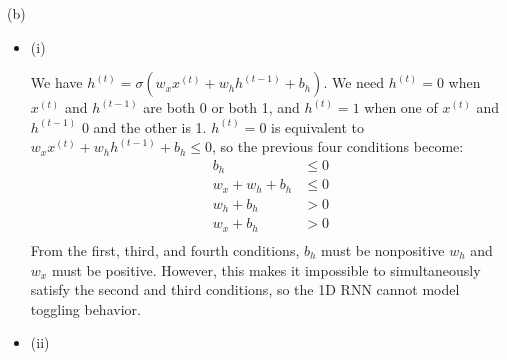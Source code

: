 \documentclass{article}
\begin{document}
(b)
\begin{itemize}
\item (i) 

We have $h^{(t)} = \sigma(w_xx^{(t)} + w_hh^{(t-1)} + b_h)$. We need $h^{(t)} = 0$ when $x^{(t)}$ and $h^{(t-1)}$ are both 0 or both 1, and $h^{(t)} = 1$ when one of $x^{(t)}$ and $h^{(t-1)}$ 0 and the other is 1. $h^{(t)} = 0$ is equivalent to $w_xx^{(t)} + w_hh^{(t-1)} + b_h \le 0$, so the previous four conditions become:
\begin{align*}
b_h &\le 0 \\
w_x + w_h + b_h &\le 0 \\
w_h + b_h &> 0 \\
w_x + b_h &> 0\\
\end{align*}
From the first, third, and fourth conditions, $b_h$ must be nonpositive $w_h$ and $w_x$ must be positive. However, this makes it impossible to simultaneously satisfy the second and third conditions, so the 1D RNN cannot model toggling behavior.

\item (ii)


\end{itemize}
\end{document}
